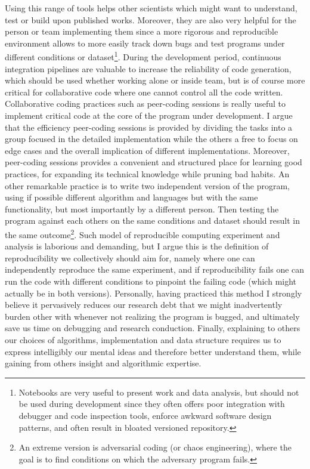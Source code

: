 Using this range of tools helps other scientists which might want to understand, test or build upon published works.
Moreover, they are also very helpful for the person or team implementing them since a more rigorous and reproducible environment allows to more easily track down bugs and test programs under different conditions or dataset\footnote{Notebooks are very useful to present work and data analysis, but should not be used during development since they often offers poor integration with debugger and code inspection tools, enforce awkward software design patterns, and often result in bloated versioned repository.}.
During the development period, continuous integration pipelines are valuable to increase the reliability of code generation, which should be used whether working alone or inside team, but is of course more critical for collaborative code where one cannot control all the code written.
Collaborative coding practices such as peer-coding sessions is really useful to implement critical code at the core of the program under development.
I argue that the efficiency peer-coding sessions is provided by dividing the tasks into a group focused in the detailed implementation while the others a free to focus on edge cases and the overall implication of different implementations.
Moreover, peer-coding sessions provides a convenient and structured place for learning good practices, for expanding its technical knowledge while pruning bad habits.
An other remarkable practice is to write two independent version of the program, using if possible different algorithm and languages but with the same functionality, but most importantly by a different person.
Then testing the program against each others on the same conditions and dataset should result in the same outcome\footnote{An extreme version is adversarial coding (or chaos engineering), where the goal is to find conditions on which the adversary program fails.}.
Such model of reproducible computing experiment and analysis is laborious and demanding, but I argue this is the definition of reproducibility we collectively should aim for, namely where one can independently reproduce the same experiment, and if reproducibility fails one can run the code with different conditions to pinpoint the failing code (which might actually be in both versions).
Personally, having practiced this method I strongly believe it pervasively reduces our research debt that we might inadvertently burden other with whenever not realizing the program is bugged, and ultimately save us time on debugging and research conduction.
Finally, explaining to others our choices of algorithms, implementation and data structure requires us to express intelligibly our mental ideas and therefore better understand them, while gaining from others insight and algorithmic expertise.



